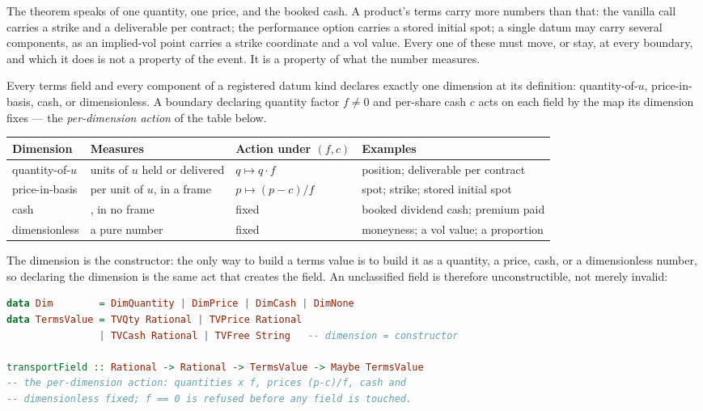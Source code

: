 The theorem speaks of one quantity, one price, and the booked cash. A
product's terms carry more numbers than that: the vanilla call carries a
strike and a deliverable per contract; the performance option carries a stored
initial spot; a single datum may carry several components, as an implied-vol
point carries a strike coordinate and a vol value. Every one of these must
move, or stay, at every boundary, and which it does is not a property of the
event. It is a property of what the number measures.

\begin{definition}
\label{def:dimension-declaration}
Every terms field and every component of a registered datum kind declares
exactly one dimension at its definition: quantity-of-$u$, price-in-basis,
cash, or dimensionless. A boundary declaring quantity factor $f\neq0$ and
per-share cash $c$ acts on each field by the map its dimension fixes --- the
\emph{per-dimension action} of the table below.
\end{definition}

\begin{center}
\begin{tabular}{@{}llll@{}}
\toprule
\textbf{Dimension} & \textbf{Measures} & \textbf{Action under $(f,c)$} &
\textbf{Examples} \\
\midrule
quantity-of-$u$ & units of $u$ held or delivered & $q\mapsto q\cdot f$ &
position; deliverable per contract \\
price-in-basis & \EUR{} per unit of $u$, in a frame & $p\mapsto(p-c)/f$ &
spot; strike; stored initial spot \\
cash & \EUR{}, in no frame & fixed & booked dividend cash; premium paid \\
dimensionless & a pure number & fixed & moneyness; a vol value; a proportion \\
\bottomrule
\end{tabular}
\end{center}

The dimension is the constructor: the only way to build a terms value is to
build it as a quantity, a price, cash, or a dimensionless number, so
declaring the dimension is the same act that creates the field. An
unclassified field is therefore unconstructible, not merely invalid:

\begin{lstlisting}[language=Haskell]
data Dim        = DimQuantity | DimPrice | DimCash | DimNone
data TermsValue = TVQty Rational | TVPrice Rational
                | TVCash Rational | TVFree String   -- dimension = constructor

transportField :: Rational -> Rational -> TermsValue -> Maybe TermsValue
-- the per-dimension action: quantities x f, prices (p-c)/f, cash and
-- dimensionless fixed; f == 0 is refused before any field is touched.
\end{lstlisting}

